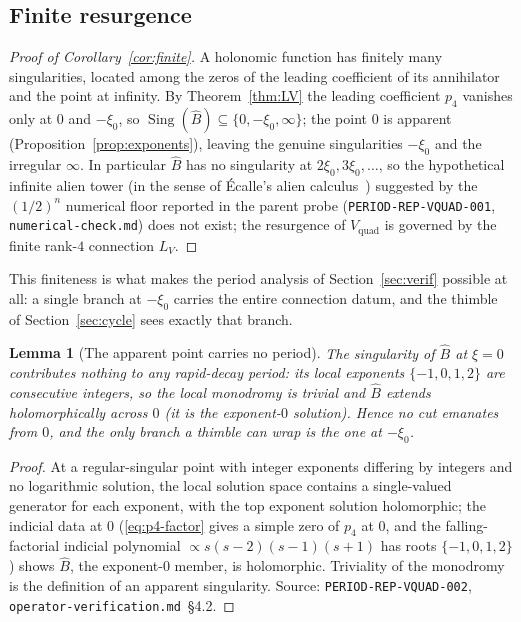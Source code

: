 \documentclass[11pt,reqno]{amsart}
\theoremstyle{plain}
\newtheorem{lemma}[theorem]{Lemma}
\theoremstyle{definition}
\newcommand{\Vquad}{V_{\mathrm{quad}}}
\newcommand{\Bhat}{\widehat{B}}
\newcommand{\LV}{L_{V}}
\newcommand{\xizero}{\xi_0}
\begin{document}
\subsection{Finite resurgence}
\begin{proof}[Proof of Corollary~\ref{cor:finite}]
A holonomic function has finitely many singularities, located among the zeros of the leading
coefficient of its annihilator and the point at infinity. By Theorem~\ref{thm:LV} the leading
coefficient $p_4$ vanishes only at $0$ and $-\xizero$, so
$\operatorname{Sing}(\Bhat)\subseteq\{0,-\xizero,\infty\}$; the point $0$ is apparent
(Proposition~\ref{prop:exponents}), leaving the genuine singularities $-\xizero$ and the
irregular $\infty$. In particular $\Bhat$ has no singularity at $2\xizero,3\xizero,\dots$, so the
hypothetical infinite alien tower (in the sense of \'Ecalle's alien calculus~\cite{Ecalle})
suggested by the $(1/2)^n$ numerical floor reported in the parent probe
(\texttt{PERIOD-REP-VQUAD-001}, \texttt{numerical-check.md})
does not exist; the resurgence of $\Vquad$ is governed by the finite rank-$4$ connection $\LV$.
\end{proof}

This finiteness is what makes the period analysis of Section~\ref{sec:verif} possible at all: a
single branch at $-\xizero$ carries the entire connection datum, and the thimble of
Section~\ref{sec:cycle} sees exactly that branch.

\begin{lemma}[The apparent point carries no period]\label{lem:apparent}
The singularity of $\Bhat$ at $\xi=0$ contributes nothing to any rapid-decay period: its local
exponents $\{-1,0,1,2\}$ are consecutive integers, so the local monodromy is trivial and $\Bhat$
extends holomorphically across $0$ (it is the exponent-$0$ solution). Hence no cut emanates from
$0$, and the only branch a thimble can wrap is the one at $-\xizero$.
\end{lemma}

\begin{proof}
At a regular-singular point with integer exponents differing by integers and no logarithmic
solution, the local solution space contains a single-valued generator for each exponent, with the
top exponent solution holomorphic; the indicial data at $0$
(\eqref{eq:p4-factor} gives a simple zero of $p_4$ at $0$, and the falling-factorial indicial
polynomial $\propto s(s-2)(s-1)(s+1)$ has roots $\{-1,0,1,2\}$) shows $\Bhat$, the exponent-$0$
member, is holomorphic. Triviality of the monodromy is the definition of an apparent singularity.
Source: \texttt{PERIOD-REP-VQUAD-002}, \texttt{operator-verification.md}~\S4.2.
\end{proof}
\end{document}
